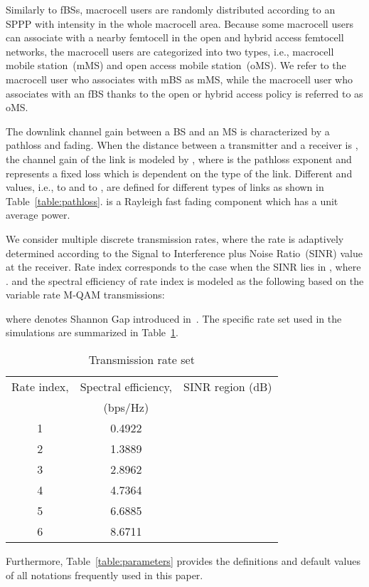 \documentclass[journal]{IEEEtran}
\begin{document}
Similarly to fBSs, macrocell users are randomly distributed according to an SPPP
with intensity  in the whole macrocell area.
Because some macrocell users can associate with a nearby femtocell
in the open and hybrid access femtocell networks,
the macrocell users are categorized into
two types,
i.e., macrocell mobile station~(mMS) and open access mobile station~(oMS).
We refer to the macrocell user who associates with mBS as mMS, while
the macrocell user who associates with an fBS thanks to the open or hybrid  access
policy is referred to as oMS.

The downlink channel gain between a BS and an MS is characterized by a pathloss and fading.
When the distance between a transmitter and a receiver is , the channel
gain of the link is modeled by , where  is the pathloss exponent and  represents a fixed loss
which is dependent on the type of the link.
Different  and  values, i.e.,  to  and  to , are
defined for different types of links as shown in Table~\ref{table:pathloss}.
 is a
Rayleigh fast fading component which has a unit average power.


We consider multiple discrete transmission rates, where the rate is adaptively determined according
to the Signal to Interference plus Noise Ratio~(SINR) value at the receiver.
Rate index  corresponds to the case when the SINR lies in , where .
and the spectral efficiency of
rate index 
is modeled as the following based on the variable rate
M-QAM transmissions:

where  denotes Shannon Gap introduced in~\cite{tcom97goldsmith}.
The specific rate set used in the simulations are summarized in Table~\ref{table:rate_sets}.
\begin{table}
 \centering
 \caption{Transmission rate set}\label{table:rate_sets}
 \begin{tabular}{|c||c||c|}
 \hline
 Rate index,   & Spectral efficiency,  & SINR region (dB)  \\
                  & (bps/Hz) &    \\
 \hline\hline
 1 & 0.4922  & \\ \hline
 2 & 1.3889 & \\ \hline
 3 & 2.8962 & \\ \hline
 4 & 4.7364 & \\ \hline
 5 & 6.6885 & \\ \hline
 6 & 8.6711 & \\ \hline
 \end{tabular}
\end{table}
Furthermore, Table~\ref{table:parameters} provides the definitions and default values
of all notations frequently used in this paper.
\end{document}
